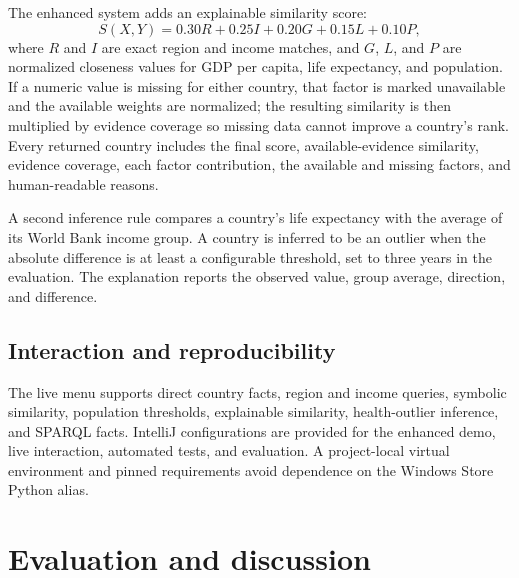 \documentclass[12pt,a4paper]{article}
\begin{document}
The enhanced system adds an explainable similarity score:
\begin{equation}
S(X,Y)=0.30R+0.25I+0.20G+0.15L+0.10P,
\end{equation}
where $R$ and $I$ are exact region and income matches, and $G$, $L$, and $P$ are normalized closeness values for GDP per capita, life expectancy, and population. If a numeric value is missing for either country, that factor is marked unavailable and the available weights are normalized; the resulting similarity is then multiplied by evidence coverage so missing data cannot improve a country's rank. Every returned country includes the final score, available-evidence similarity, evidence coverage, each factor contribution, the available and missing factors, and human-readable reasons.

A second inference rule compares a country's life expectancy with the average of its World Bank income group. A country is inferred to be an outlier when the absolute difference is at least a configurable threshold, set to three years in the evaluation. The explanation reports the observed value, group average, direction, and difference.

\subsection{Interaction and reproducibility}
The live menu supports direct country facts, region and income queries, symbolic similarity, population thresholds, explainable similarity, health-outlier inference, and SPARQL facts. IntelliJ configurations are provided for the enhanced demo, live interaction, automated tests, and evaluation. A project-local virtual environment and pinned requirements avoid dependence on the Windows Store Python alias.

\section{Evaluation and discussion}
\end{document}
